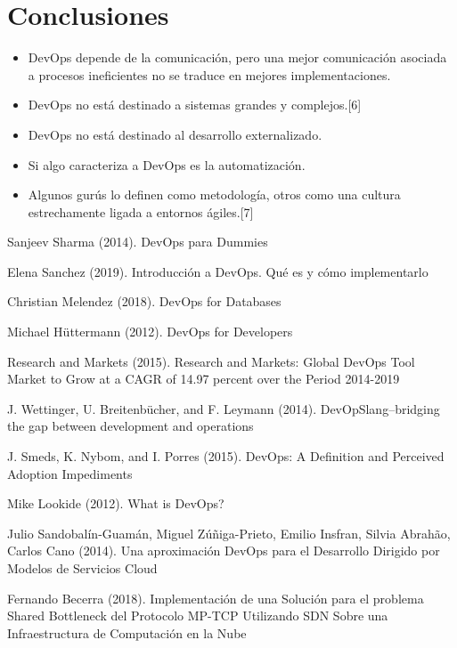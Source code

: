 \documentclass[twoside,twocolumn]{article}
\begin{document}
\section{Conclusiones}
\begin{itemize}
\item DevOps depende de la comunicación, pero una mejor comunicación asociada a procesos ineficientes no se traduce en mejores implementaciones.
\item DevOps no está destinado a sistemas grandes y complejos.[6]
\item DevOps no está destinado al desarrollo externalizado.
\item Si algo caracteriza a DevOps es la automatización.
\item Algunos gurús lo definen como metodología, otros como una cultura estrechamente ligada a entornos ágiles.[7]

\end{itemize}


\begin{thebibliography}{99} %
Sanjeev Sharma (2014).
\newblock DevOps para Dummies

Elena Sanchez (2019).
\newblock Introducción a DevOps. Qué es y cómo implementarlo

Christian Melendez (2018).
\newblock DevOps for Databases

Michael Hüttermann (2012).
\newblock DevOps for Developers

Research and Markets (2015).
\newblock Research and Markets: Global DevOps Tool Market to Grow at a CAGR of 14.97 percent  over the Period 2014-2019

J. Wettinger, U. Breitenbücher, and F. Leymann (2014).
\newblock DevOpSlang–bridging the gap between development and operations

J. Smeds, K. Nybom, and I. Porres (2015).
\newblock DevOps: A Definition and Perceived Adoption Impediments

Mike Lookide (2012).
\newblock What is DevOps?

Julio Sandobalín-Guamán,  Miguel Zúñiga-Prieto,  Emilio Insfran, Silvia Abrahão, Carlos Cano (2014).
\newblock Una aproximación DevOps para el Desarrollo Dirigido por Modelos de Servicios Cloud 

Fernando Becerra (2018).
\newblock Implementación de una Solución para el problema Shared Bottleneck del Protocolo MP-TCP Utilizando SDN Sobre una Infraestructura de Computación en la Nube
 
\end{thebibliography}

\end{document}
